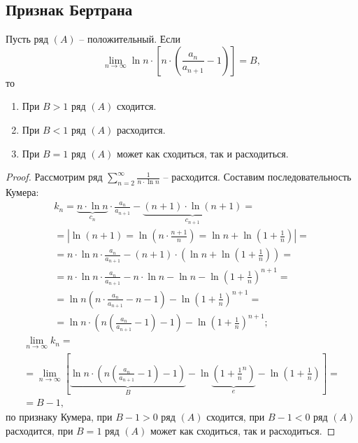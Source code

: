 \subsection{Признак Бертрана}

\begin{theorem}
    Пусть ряд $(A)$ -- положительный. Если
    \[
        \underset{n\rightarrow\infty}{\lim} \ln n \cdot \left[n \cdot (\frac{a_n}{a_{n+1}} - 1)\right] = B,
    \]
    то
    \begin{enumerate}
        \item При $B > 1$ ряд $(A)$ сходится.
        \item При $B < 1$ ряд $(A)$ расходится.
        \item При $B = 1$ ряд $(A)$ может как сходиться, так и расходиться.
    \end{enumerate}
\end{theorem}

\begin{proof}
    Рассмотрим ряд $\sum_{n=2}^{\infty} \frac{1}{n\cdot \ln n}$ -- расходится. Составим последовательность Кумера:
    \begin{multline*}
        k_n = \underbrace{n \cdot \ln n}_{c_n} \cdot \frac{a_n}{a_{n+1}} - \underbrace{(n+1) \cdot \ln(n+1)}_{c_{n+1}} = \\
        = \left| \ln(n+1) = \ln\left(n\cdot \frac{n+1}{n}\right) = \ln n + \ln\left(1 + \frac{1}{n}\right) \right| = \\
        = n \cdot \ln n \cdot \frac{a_n}{a_{n+1}} - (n+1)\cdot \left(\ln n + \ln\left(1 + \frac{1}{n}\right)\right) = \\
        = n \cdot \ln n \cdot \frac{a_n}{a_{n+1}} - n\cdot \ln n - \ln n - \ln\left(1 + \frac{1}{n}\right)^{n+1} = \\
        = \ln n \left(n \cdot \frac{a_n}{a_{n+1}} - n - 1\right) - \ln \left(1 + \frac{1}{n}\right)^{n+1} = \\
        = \ln n \cdot \left(n\left(\frac{a_n}{a_{n+1}} - 1\right) - 1\right) - \ln\left(1+\frac{1}{n}\right)^{n+1};
    \end{multline*}
    \begin{multline*}
        \underset{n\rightarrow\infty}{\lim} k_n = \\
        = \underset{n\rightarrow\infty}{\lim}\left[\underbrace{\ln n \cdot \left(n\left(\frac{a_n}{a_{n+1}} - 1\right) - 1\right)}_{B} - \ln\underbrace{\left(1 + \frac{1}{n}^n\right)}_{e} - \ln\left(1 + \frac{1}{n}\right)\right] = \\
        = B - 1,
    \end{multline*}
    по признаку Кумера, при $B-1 > 0$ ряд $(A)$ сходится, при $B-1 < 0$ ряд $(A)$ расходится, при $B=1$ ряд $(A)$ может как сходиться, так и расходиться.
\end{proof}

